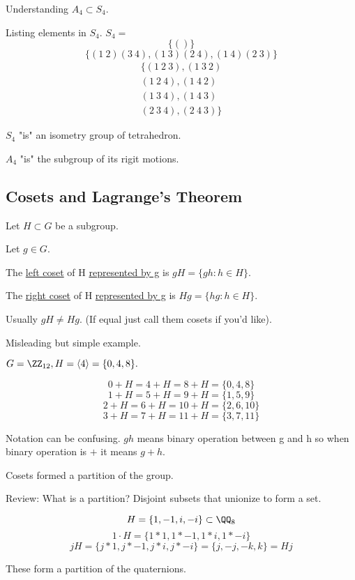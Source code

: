\documentclass[11pt]{scrartcl}
\begin{document}
Understanding $A_4 \subset S_4$.

Listing elements in $S_4$.
$S_4 = $
$$\{()\}$$
$$\{(1 \ 2)(3 \ 4), (1 \ 3)(2 \ 4), (1 \ 4)(2 \ 3)\}$$
\begin{gather*}\{
  (1 \ 2 \ 3), (1 \ 3 \ 2) \\
  (1 \ 2 \ 4), (1 \ 4 \ 2) \\
  (1 \ 3 \ 4), (1 \ 4 \ 3) \\
(2 \ 3 \ 4), (2 \ 4 \ 3) \}
\end{gather*}
\begin{note}
  $S_4$ "is"  an isometry group of tetrahedron.

  $A_4$ "is" the subgroup of its rigit motions.
\end{note}

\subsection{Cosets and Lagrange's Theorem}

Let $H \subset G$ be a subgroup.

Let $g \in G$.

The \ul{left coset} of H \ul{represented by g} is $gH = \{gh: h \in H\}$.

The \ul{right coset} of H \ul{represented by g} is $Hg = \{hg: h \in H\}$. 

Usually $gH \neq Hg$. (If equal just call them cosets if you'd like).

\begin{example}
  Misleading but simple example.

  $G = \ZZ_{12}, H = \langle 4 \rangle = \{0, 4, 8\}.$

  $$0 + H = 4 + H = 8 + H = \{0, 4, 8\}$$
  $$1 + H = 5 + H = 9 + H = \{1, 5, 9\}$$
  $$2 + H = 6 + H = 10 + H = \{2, 6, 10\}$$
  $$3 + H = 7 + H = 11 + H = \{3, 7, 11\}$$

  \begin{note}
    Notation can be confusing. $gh$ means binary operation between g and h so when binary operation is $+$ it means $g + h$.
  \end{note}

  Cosets formed a partition of the group.

  Review: What is a partition? Disjoint subsets that unionize to form a set.
\end{example}

\begin{example}
  $$H = \{1, -1, i, -i\} \subset \QQ_8$$
  $$1 \cdot H = \{1 * 1, 1 * -1, 1 * i, 1 * -i\}$$
  $$jH = \{j * 1, j * -1, j * i, j * -i\} = \{j, -j, -k, k\} = Hj$$
  \begin{note}
    These form a partition of the quaternions.
  \end{note}
\end{example}
\end{document}
